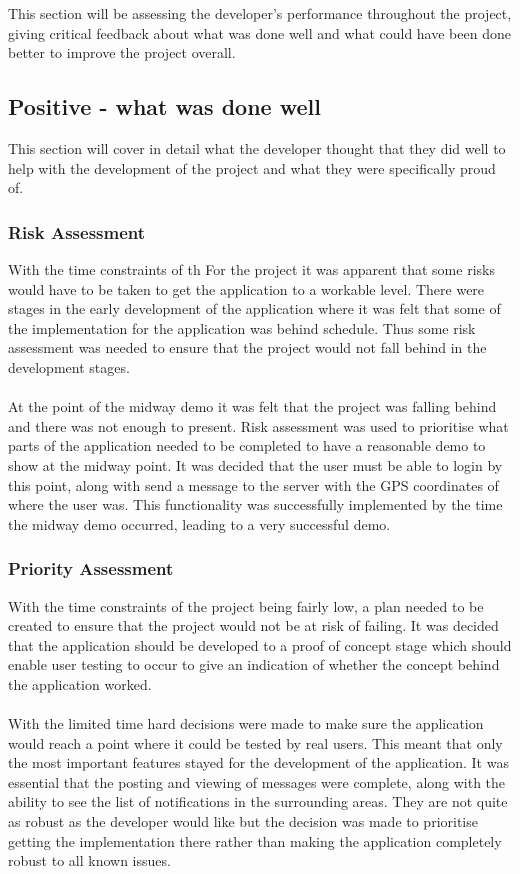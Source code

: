 This section will be assessing the developer's performance throughout the project, giving critical feedback about what was done well and what could have been done better to improve the project overall.

\subsection{Positive - what was done well}

This section will cover in detail what the developer thought that they did well to help with the development of the project and what they were specifically proud of.

\subsubsection{Risk Assessment}

With the time constraints of th
For the project it was apparent that some risks would have to be taken to get the application to a workable level. There were stages in the early development of the application where it was felt that some of the implementation for the application was behind schedule. Thus some risk assessment was needed to ensure that the project would not fall behind in the development stages.\\
\\
At the point of the midway demo it was felt that the project was falling behind and there was not enough to present. Risk assessment was used to prioritise what parts of the application needed to be completed to have a reasonable demo to show at the midway point. It was decided that the user must be able to login by this point, along with send a message to the server with the GPS coordinates of where the user was. This functionality was successfully implemented by the time the midway demo occurred, leading to a very successful demo.

\subsubsection{Priority Assessment}
With the time constraints of the project being fairly low, a plan needed to be created to ensure that the project would not be at risk of failing. It was decided that the application should be developed to a proof of concept stage which should enable user testing to occur to give an indication of whether the concept behind the application worked.\\
\\
With the limited time hard decisions were made to make sure the application would reach a point where it could be tested by real users. This meant that only the most important features stayed for the development of the application. It was essential that the posting and viewing of messages were complete, along with the ability to see the list of notifications in the surrounding areas. They are not quite as robust as the developer would like but the decision was made to prioritise getting the implementation there rather than making the application completely robust to all known issues.

